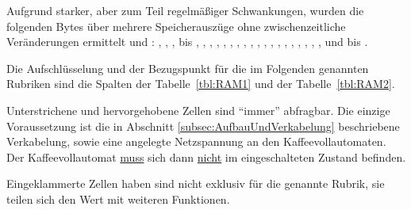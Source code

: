 Aufgrund starker, aber zum Teil regelmäßiger Schwankungen, wurden die folgenden Bytes über mehrere Speicherauszüge ohne zwischenzeitliche Veränderungen ermittelt und :
, , ,  bis , , , , , , , , , , , , , , , , , , ,  und  bis .

Die Aufschlüsselung und der Bezugspunkt für die im Folgenden genannten Rubriken sind die Spalten der Tabelle~\ref{tbl:RAM1} und der Tabelle~\ref{tbl:RAM2}.

Unterstrichene und hervorgehobene Zellen sind "`immer"' abfragbar.
Die einzige Voraussetzung ist die in Abschnitt \ref{subsec:AufbauUndVerkabelung} beschriebene Verkabelung, sowie eine angelegte Netzspannung an den Kaffeevollautomaten.
Der Kaffeevollautomat \underline{muss} sich dann \underline{nicht} im eingeschalteten Zustand befinden.

Eingeklammerte Zellen haben sind nicht exklusiv für die genannte Rubrik, sie teilen sich den Wert mit weiteren Funktionen.

